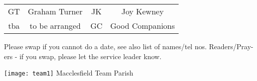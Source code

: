 \documentclass[10pt]{article}
\newif\ifpdf
\begin{document}
\begin{center}
\vspace{1em}
\begin{tabular}{|c|c|c|c|}\hline
 GT & Graham Turner & JK & Joy Kewney   \\
 tba & to be arranged & GC &  Good Companions \\
     \hline
  \end{tabular}
\end{center}
\begin{minipage}{0.7\textwidth}
Please swap if you cannot do a date, see also list of names/tel nos.
Readers/Pray-ers - if you swap, please let the service leader know.
\end{minipage}
\begin{minipage}{0.3\textwidth}
\ifpdf
\fbox{
\texttt{[image: team1]} Macclesfield Team Parish
}
\else
\hspace{2em}
\texttt{[image: team1]} Macclesfield Team Parish
\fi
\end{minipage}
\end{document}

